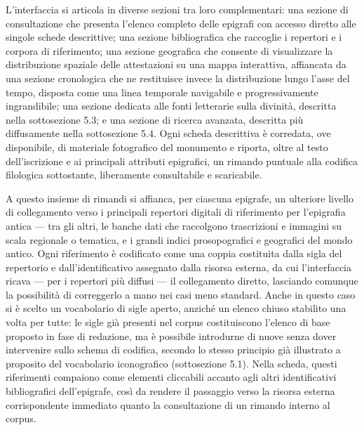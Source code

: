 \documentclass[11pt,a4paper]{article}
\begin{document}
L'interfaccia si articola in diverse sezioni tra loro complementari:
una sezione di consultazione che presenta l'elenco completo delle
epigrafi con accesso diretto alle singole schede descrittive; una
sezione bibliografica che raccoglie i repertori e i corpora di
riferimento; una sezione geografica che consente di visualizzare la
distribuzione spaziale delle attestazioni su una mappa interattiva,
affiancata da una sezione cronologica che ne restituisce invece la
distribuzione lungo l'asse del tempo, disposta come una linea temporale
navigabile e progressivamente ingrandibile; una sezione dedicata alle
fonti letterarie sulla divinità, descritta nella sottosezione 5.3; e
una sezione di ricerca avanzata, descritta più diffusamente nella
sottosezione 5.4. Ogni scheda descrittiva è corredata, ove disponibile,
di materiale fotografico del monumento e riporta, oltre al testo
dell'iscrizione e ai principali attributi epigrafici, un rimando
puntuale alla codifica filologica sottostante, liberamente
consultabile e scaricabile.

A questo insieme di rimandi si affianca, per ciascuna epigrafe, un
ulteriore livello di collegamento verso i principali repertori
digitali di riferimento per l'epigrafia antica --- tra gli altri, le
banche dati che raccolgono trascrizioni e immagini su scala regionale
o tematica, e i grandi indici prosopografici e geografici del mondo
antico. Ogni riferimento è codificato come una coppia costituita dalla
sigla del repertorio e dall'identificativo assegnato dalla risorsa
esterna, da cui l'interfaccia ricava --- per i repertori più diffusi
--- il collegamento diretto, lasciando comunque la possibilità di
correggerlo a mano nei casi meno standard. Anche in questo caso si è
scelto un vocabolario di sigle aperto, anziché un elenco chiuso
stabilito una volta per tutte: le sigle già presenti nel corpus
costituiscono l'elenco di base proposto in fase di redazione, ma è
possibile introdurne di nuove senza dover intervenire sullo schema di
codifica, secondo lo stesso principio già illustrato a proposito del
vocabolario iconografico (sottosezione 5.1). Nella scheda, questi
riferimenti compaiono come elementi cliccabili accanto agli altri
identificativi bibliografici dell'epigrafe, così da rendere il
passaggio verso la risorsa esterna corrispondente immediato quanto la
consultazione di un rimando interno al corpus.
\end{document}

